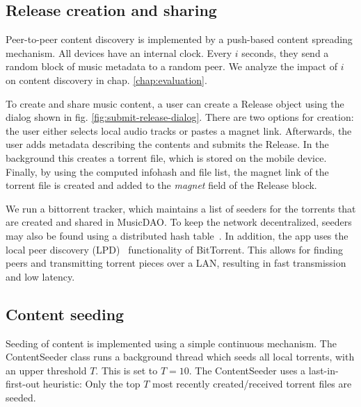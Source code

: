 \subsection{Release creation and sharing}
\label{sec:torrent-creation}
Peer-to-peer content discovery is implemented by a push-based content spreading mechanism. All devices have an internal clock. Every $i$ seconds, they send a random block of music metadata to a random peer. We analyze the impact of $i$ on content discovery in chap. \ref{chap:evaluation}. 

To create and share music content, a user can create a Release object using the dialog shown in fig. \ref{fig:submit-release-dialog}. There are two options for creation: the user either selects local audio tracks or pastes a magnet link. Afterwards, the user adds metadata describing the contents and submits the Release. In the background this creates a torrent file, which is stored on the mobile device. Finally, by using the computed infohash and file list, the magnet link of the torrent file is created and added to the \textit{magnet} field of the Release block.

We run a bittorrent tracker, which maintains a list of seeders for the torrents that are created and shared in MusicDAO. To keep the network decentralized, seeders may also be found using a distributed hash table~\citep{dht2019}. In addition, the app uses the local peer discovery (LPD)~\citep{bittorrentbep142015} functionality of BitTorrent. This allows for finding peers and transmitting torrent pieces over a LAN, resulting in fast transmission and low latency.
\subsection{Content seeding}
\label{sec:content-seeding}
Seeding of content is implemented using a simple continuous mechanism. The ContentSeeder class runs a background thread which seeds all local torrents, with an upper threshold \(T\). This is set to \(T=10\). The ContentSeeder uses a last-in-first-out heuristic: Only the top \(T\) most recently created/received torrent files are seeded.

